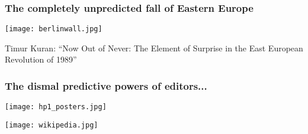 \begin{frame}
  \frametitle{The completely unpredicted fall of Eastern Europe}

  \texttt{[image: berlinwall.jpg]}

  Timur Kuran:\cite{kuran1991a,kuran1997a} 
  ``Now Out of Never: The Element of Surprise in the East European Revolution of 1989''

\end{frame}


\begin{frame}
  \frametitle{The dismal predictive powers of editors...}

  \begin{center}
    \texttt{[image: hp1\_posters.jpg]}
  \end{center}

  \texttt{[image: wikipedia.jpg]}

\end{frame}


